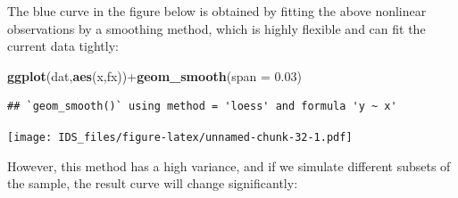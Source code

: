 \documentclass[12pt,]{krantz}
\newenvironment{Shaded}{\begin{snugshade}}{\end{snugshade}}
\newcommand{\KeywordTok}[1]{\textcolor[rgb]{0.13,0.29,0.53}{\textbf{{#1}}}}
\newcommand{\DataTypeTok}[1]{\textcolor[rgb]{0.13,0.29,0.53}{{#1}}}
\newcommand{\FloatTok}[1]{\textcolor[rgb]{0.00,0.00,0.81}{{#1}}}
\newcommand{\NormalTok}[1]{{#1}}
\theoremstyle{definition}
\theoremstyle{definition}
\theoremstyle{remark}
\begin{document}
The blue curve in the figure below is obtained by fitting the above
nonlinear observations by a smoothing method, which is highly flexible
and can fit the current data tightly:

\begin{Shaded}
\begin{Highlighting}[]
\KeywordTok{ggplot}\NormalTok{(dat,}\KeywordTok{aes}\NormalTok{(x,fx))+}\KeywordTok{geom_smooth}\NormalTok{(}\DataTypeTok{span =} \FloatTok{0.03}\NormalTok{)}
\end{Highlighting}
\end{Shaded}

\begin{verbatim}
## `geom_smooth()` using method = 'loess' and formula 'y ~ x'
\end{verbatim}

\texttt{[image: IDS\_files/figure-latex/unnamed-chunk-32-1.pdf]}

However, this method has a high variance, and if we simulate different
subsets of the sample, the result curve will change significantly:
\end{document}

